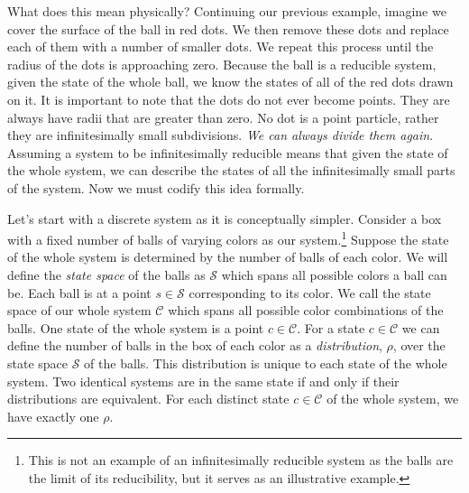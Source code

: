 \documentclass{article}
\begin{document}
	 What does this mean physically? Continuing our previous example, imagine we cover the surface of the ball in red dots. We then remove these dots and replace each of them with a number of smaller dots. We repeat this process until the radius of the dots is approaching zero. Because the ball is a reducible system, given the state of the whole ball, we know the states of all of the red dots drawn on it. It is important to note that the dots do not ever become points. They are always have radii that are greater than zero. No dot is a point particle, rather they are infinitesimally small subdivisions. \textit{We can always divide them again}. Assuming a system to be infinitesimally reducible means that given the state of the whole system, we can describe the states of all the infinitesimally small parts of the system. Now we must codify this idea formally.
	 	
	Let's start with a discrete system as it is conceptually simpler. Consider a box with a fixed number of balls of varying colors as our system.\footnote{This is not an example of an infinitesimally reducible system as the balls are the limit of its reducibility, but it serves as an illustrative example.} Suppose the state of the whole system is determined by the number of balls of each color. We will define the \textit{state space} of the balls as $\mathcal{S}$ which spans all possible colors a ball can be. Each ball is at a point $s \in \mathcal{S}$ corresponding to its color. We call the state space of our whole system $\mathcal{C}$ which spans all possible color combinations of the balls. One state of the whole system is a point $c \in \mathcal{C}$. For a state $c \in \mathcal{C}$ we can define the number of balls in the box of each color as a \textit{distribution}, $\rho$, over the state space $\mathcal{S}$ of the balls. This distribution is unique to each state of the whole system. Two identical systems are in the same state if and only if their distributions are equivalent. For each distinct state $c \in \mathcal{C}$ of the whole system, we have exactly one $\rho$. 
\end{document}
